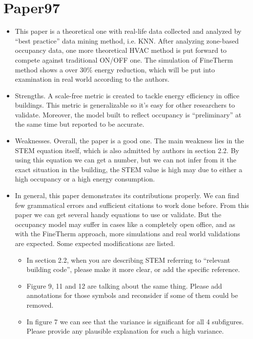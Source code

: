 \documentclass{article}
\begin{document}
 




\section{Paper97}
\label{sec:paper97}

\begin{itemize}
\item This paper is a theoretical one with real-life data collected
  and analyzed by ``best practice'' data mining method,
  i.e. KNN\@. After analyzing zone-based occupancy data, one more
  theoretical HVAC method is put forward to compete against
  traditional ON/OFF one. The simulation of FineTherm method shows a
  over 30\% energy reduction, which will be put into examination in
  real world according to the authors.
\item Strengths. A scale-free metric is created to tackle energy
  efficiency in office buildings. This metric is generalizable so it's
  easy for other researchers to validate. Moreover, the model built to
  reflect occupancy is ``preliminary'' at the same time but reported
  to be accurate. 
\item Weaknesses. Overall, the paper is a good one. The main weakness
  lies in the STEM equation itself, which is also admitted by authors
  in section 2.2. By using this equation we can get a number, but we
  can not infer from it the exact situation in the building, the STEM
  value is high may due to either a high occupancy or a high energy
  consumption.
\item In general, this paper demonstrates its contributions
  properly. We can find few grammatical errors and sufficient
  citations to work done before. From this paper we can get several
  handy equations to use or validate. But the occupancy model may
  suffer in cases like a completely open office, and as with the
  FineTherm approach, more simulations and real world validations are
  expected. Some expected modifications are listed.
  \begin{itemize}
  \item In section 2.2, when you are describing STEM referring to
    ``relevant building code'', please make it more clear, or add the
    specific reference.
  \item Figure 9, 11 and 12 are talking about the same thing. Please
    add annotations for those symbols and reconsider if some of them
    could be removed.
  \item In figure 7 we can see that the variance is significant for
    all 4 subfigures. Please provide any plausible explanation for
    such a high variance.
  \end{itemize}
\end{itemize}
\end{document}
